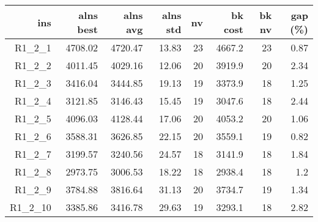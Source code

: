   \begin{table}[caption={Kết quả đo với tập HG\_R\_1\_2 200 yêu cầu}, label=exp:HGR12]
    \centering
    \begin{tabular}{rrrrrrrr}
    \hline
    ins & alns best & alns avg & alns std & nv & bk cost & bk nv & gap (\%) \\ \hline
    R1\_2\_1 & 4708.02 & 4720.47 & 13.83 & 23 & 4667.2 & 23 & 0.87 \\ \hline
    R1\_2\_2 & 4011.45 & 4029.16 & 12.06 & 20 & 3919.9 & 20 & 2.34 \\ \hline
    R1\_2\_3 & 3416.04 & 3444.85 & 19.13 & 19 & 3373.9 & 18 & 1.25 \\ \hline
    R1\_2\_4 & 3121.85 & 3146.43 & 15.45 & 19 & 3047.6 & 18 & 2.44 \\ \hline
    R1\_2\_5 & 4096.03 & 4128.44 & 17.06 & 20 & 4053.2 & 20 & 1.06 \\ \hline
    R1\_2\_6 & 3588.31 & 3626.85 & 22.15 & 20 & 3559.1 & 19 & 0.82 \\ \hline
    R1\_2\_7 & 3199.57 & 3240.56 & 24.57 & 18 & 3141.9 & 18 & 1.84 \\ \hline
    R1\_2\_8 & 2973.75 & 3006.53 & 18.22 & 18 & 2938.4 & 18 & 1.2 \\ \hline
    R1\_2\_9 & 3784.88 & 3816.64 & 31.13 & 20 & 3734.7 & 19 & 1.34 \\ \hline
    R1\_2\_10 & 3385.86 & 3416.78 & 29.63 & 19 & 3293.1 & 18 & 2.82 \\ \hline
    \end{tabular}
  \end{table}

